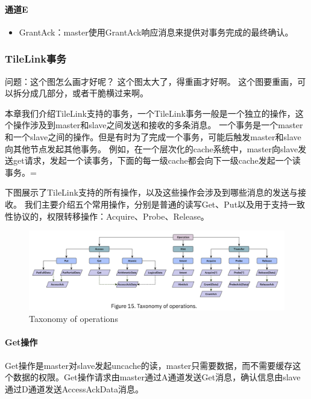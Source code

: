 \begin{center}
\paragraph{通道E}
\begin{itemize}
	\item GrantAck：master使用GrantAck响应消息来提供对事务完成的最终确认。
\end{itemize}

\subsubsection{TileLink事务}

问题：这个图怎么画才好呢？
这个图太大了，得重画才好啊。
这个图要重画，可以拆分成几部分，或者干脆横过来啊。

本章我们介绍TileLink支持的事务，一个TileLink事务一般是一个独立的操作，这个操作涉及到master和slave之间发送和接收的多条消息。
一个事务是一个master和一个slave之间的操作。但是有时为了完成一个事务，可能后触发master和slave向其他节点发起其他事务。
例如，在一个层次化的cache系统中，master向slave发送get请求，发起一个读事务，下面的每一级cache都会向下一级cache发起一个读事务。=

下图展示了TileLink支持的所有操作，以及这些操作会涉及到哪些消息的发送与接收。
我们主要介绍五个常用操作，分别是普通的读写Get、Put以及用于支持一致性协议的，权限转移操作：Acquire、Probe、Release。

\begin{figure}[H] %
\centering %
\includegraphics[width=\textwidth]{Img/TileLink_Operations.PNG} %
\caption{Taxonomy of operations} %
\label{TileLink_Operations} %
\end{figure}

\paragraph{Get操作}
Get操作是master对slave发起uncache的读，master只需要数据，而不需要缓存这个数据的权限。Get操作请求由master通过A通道发送Get消息，确认信息由slave通过D通道发送AccessAckData消息。


\end{center}
